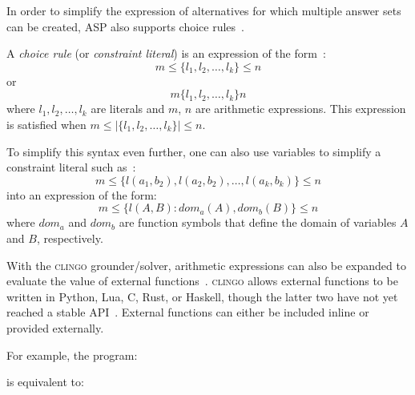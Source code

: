In order to simplify the expression of alternatives for which multiple answer sets can be created, ASP also supports choice rules~\citep{calimeri_asp-core-2_2020,balduccini_asp_2011}.

\begin{definition}
    A \textit{choice rule} (or \textit{constraint literal}) is an expression of the form~\citep{calimeri_asp-core-2_2020,balduccini_asp_2011}:
    \begin{equation}
        m \le \{l_1,l_2, \dots, l_k\} \le n
    \end{equation}
    or
    \begin{equation}
        m \{l_1,l_2, \dots, l_k\} n
    \end{equation}
    where $ l_1,l_2, \dots, l_k $ are literals and $m$, $n$ are arithmetic expressions.
    This expression is satisfied when $m \le |\{ l_1,l_2, \dots, l_k\}| \le n$.

    To simplify this syntax even further, one can also use variables to simplify a constraint literal such as~\citep{balduccini_asp_2011}:
    \begin{equation}
        m \le \{l(a_1, b_2),l(a_2,b_2), \dots, l(a_k, b_k)\} \le n
    \end{equation}
    into an expression of the form:
    \begin{equation}
        m \le \{l(A, B) : dom_a(A), dom_b(B)\} \le n
    \end{equation}
    where $dom_a$ and $dom_b$ are function symbols that define the domain of variables $A$ and $B$, respectively.
\end{definition}

With the \textsc{clingo} grounder/solver\footnotemark, arithmetic expressions can also be expanded to evaluate the value of external functions~\citep{gebser_potassco_2019}.
\textsc{clingo} allows external functions to be written in Python, Lua, C, Rust, or Haskell, though the latter two have not yet reached a stable API~\citep{roland_kaminski_potasscoclingo_2020,sven_thiele_potasscoclingo-rs_2020,paul_ogris_tsahytclingo-haskell_2020}.
External functions can either be included inline or provided externally\footnotemark.

For example, the program:

is equivalent to:


